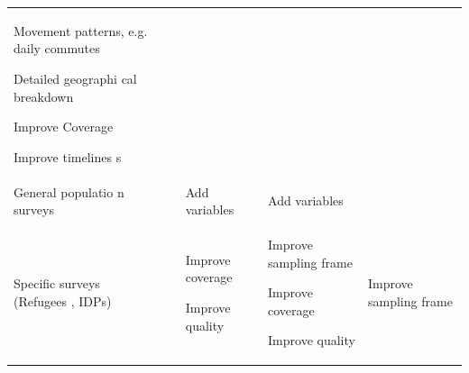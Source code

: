 \documentclass[
]{article}
\begin{document}
\begin{longtable}[]{@{}llllll@{}}
\begin{minipage}[t]{0.14\columnwidth}
Movement
patterns,
e.g.
daily
commutes

Detailed
geographi
cal
breakdown

Improve
Coverage

Improve
timelines
s\strut
\end{minipage}\tabularnewline
\begin{minipage}[t]{0.14\columnwidth}\raggedright
General
populatio
n
surveys\strut
\end{minipage} & \begin{minipage}[t]{0.14\columnwidth}\raggedright
\strut
\end{minipage} & \begin{minipage}[t]{0.14\columnwidth}\raggedright
\strut
\end{minipage} & \begin{minipage}[t]{0.14\columnwidth}\raggedright
Add
variables\strut
\end{minipage} & \begin{minipage}[t]{0.14\columnwidth}\raggedright
Add
variables\strut
\end{minipage} & \begin{minipage}[t]{0.14\columnwidth}\raggedright
\strut
\end{minipage}\tabularnewline
\begin{minipage}[t]{0.14\columnwidth}\raggedright
Specific
surveys
(Refugees
,
IDPs)\strut
\end{minipage} & \begin{minipage}[t]{0.14\columnwidth}\raggedright
\strut
\end{minipage} & \begin{minipage}[t]{0.14\columnwidth}\raggedright
\strut
\end{minipage} & \begin{minipage}[t]{0.14\columnwidth}\raggedright
Improve
coverage

Improve
quality\strut
\end{minipage} & \begin{minipage}[t]{0.14\columnwidth}\raggedright
Improve
sampling
frame

Improve
coverage

Improve
quality\strut
\end{minipage} & \begin{minipage}[t]{0.14\columnwidth}\raggedright
Improve
sampling
frame


\end{minipage}
\end{longtable}
\end{document}
